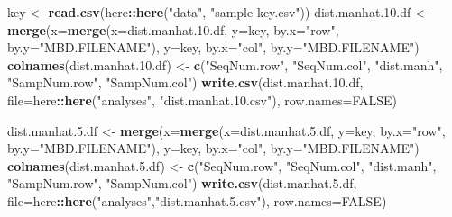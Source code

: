 \documentclass[]{article}
\newenvironment{Shaded}{\begin{snugshade}}{\end{snugshade}}
\newcommand{\KeywordTok}[1]{\textcolor[rgb]{0.13,0.29,0.53}{\textbf{#1}}}
\newcommand{\DataTypeTok}[1]{\textcolor[rgb]{0.13,0.29,0.53}{#1}}
\newcommand{\FloatTok}[1]{\textcolor[rgb]{0.00,0.00,0.81}{#1}}
\newcommand{\StringTok}[1]{\textcolor[rgb]{0.31,0.60,0.02}{#1}}
\newcommand{\OtherTok}[1]{\textcolor[rgb]{0.56,0.35,0.01}{#1}}
\newcommand{\OperatorTok}[1]{\textcolor[rgb]{0.81,0.36,0.00}{\textbf{#1}}}
\newcommand{\NormalTok}[1]{#1}
\begin{document}
\begin{Shaded}
\begin{Highlighting}[]
\NormalTok{key <-}\StringTok{ }\KeywordTok{read.csv}\NormalTok{(here}\OperatorTok{::}\KeywordTok{here}\NormalTok{(}\StringTok{"data"}\NormalTok{, }\StringTok{"sample-key.csv"}\NormalTok{))}
\NormalTok{dist.manhat.}\FloatTok{10.}\NormalTok{df <-}\StringTok{ }\KeywordTok{merge}\NormalTok{(}\DataTypeTok{x=}\KeywordTok{merge}\NormalTok{(}\DataTypeTok{x=}\NormalTok{dist.manhat.}\FloatTok{10.}\NormalTok{df, }\DataTypeTok{y=}\NormalTok{key, }\DataTypeTok{by.x=}\StringTok{"row"}\NormalTok{, }\DataTypeTok{by.y=}\StringTok{"MBD.FILENAME"}\NormalTok{), }\DataTypeTok{y=}\NormalTok{key, }\DataTypeTok{by.x=}\StringTok{"col"}\NormalTok{, }\DataTypeTok{by.y=}\StringTok{"MBD.FILENAME"}\NormalTok{)}
\KeywordTok{colnames}\NormalTok{(dist.manhat.}\FloatTok{10.}\NormalTok{df) <-}\StringTok{ }\KeywordTok{c}\NormalTok{(}\StringTok{"SeqNum.row"}\NormalTok{, }\StringTok{"SeqNum.col"}\NormalTok{, }\StringTok{"dist.manh"}\NormalTok{, }\StringTok{"SampNum.row"}\NormalTok{, }\StringTok{"SampNum.col"}\NormalTok{)}
\KeywordTok{write.csv}\NormalTok{(dist.manhat.}\FloatTok{10.}\NormalTok{df, }\DataTypeTok{file=}\NormalTok{here}\OperatorTok{::}\KeywordTok{here}\NormalTok{(}\StringTok{"analyses"}\NormalTok{, }\StringTok{"dist.manhat.10.csv"}\NormalTok{), }\DataTypeTok{row.names=}\OtherTok{FALSE}\NormalTok{) }

\NormalTok{dist.manhat.}\FloatTok{5.}\NormalTok{df <-}\StringTok{ }\KeywordTok{merge}\NormalTok{(}\DataTypeTok{x=}\KeywordTok{merge}\NormalTok{(}\DataTypeTok{x=}\NormalTok{dist.manhat.}\FloatTok{5.}\NormalTok{df, }\DataTypeTok{y=}\NormalTok{key, }\DataTypeTok{by.x=}\StringTok{"row"}\NormalTok{, }\DataTypeTok{by.y=}\StringTok{"MBD.FILENAME"}\NormalTok{), }\DataTypeTok{y=}\NormalTok{key, }\DataTypeTok{by.x=}\StringTok{"col"}\NormalTok{, }\DataTypeTok{by.y=}\StringTok{"MBD.FILENAME"}\NormalTok{)}
\KeywordTok{colnames}\NormalTok{(dist.manhat.}\FloatTok{5.}\NormalTok{df) <-}\StringTok{ }\KeywordTok{c}\NormalTok{(}\StringTok{"SeqNum.row"}\NormalTok{, }\StringTok{"SeqNum.col"}\NormalTok{, }\StringTok{"dist.manh"}\NormalTok{, }\StringTok{"SampNum.row"}\NormalTok{, }\StringTok{"SampNum.col"}\NormalTok{)}
\KeywordTok{write.csv}\NormalTok{(dist.manhat.}\FloatTok{5.}\NormalTok{df, }\DataTypeTok{file=}\NormalTok{here}\OperatorTok{::}\KeywordTok{here}\NormalTok{(}\StringTok{"analyses"}\NormalTok{,}\StringTok{"dist.manhat.5.csv"}\NormalTok{), }\DataTypeTok{row.names=}\OtherTok{FALSE}\NormalTok{)}
\end{Highlighting}
\end{Shaded}
\end{document}
